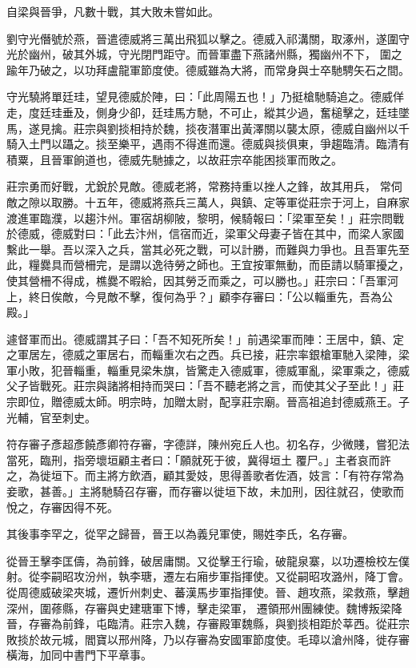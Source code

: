 \begin{pinyinscope}
 自梁與晉爭，凡數十戰，其大敗未嘗如此。



 劉守光僭號於燕，晉遣德威將三萬出飛狐以擊之。德威入祁溝關，取涿州，遂圍守光於幽州，破其外城，守光閉門距守。而晉軍盡下燕諸州縣，獨幽州不下，
 圍之踰年乃破之，以功拜盧龍軍節度使。德威雖為大將，而常身與士卒馳騁矢石之間。



 守光驍將單廷珪，望見德威於陣，曰：「此周陽五也！」乃挺槍馳騎追之。德威佯走，度廷珪垂及，側身少卻，廷珪馬方馳，不可止，縱其少過，奮槌擊之，廷珪墜馬，遂見擒。莊宗與劉掞相持於魏，掞夜潛軍出黃澤關以襲太原，德威自幽州以千騎入土門以躡之。掞至樂平，遇雨不得進而還。德威與掞俱東，爭趨臨清。臨清有積粟，且晉軍餉道也，德威先馳據之，以故莊宗卒能困掞軍而敗之。



 莊宗勇而好戰，尤銳於見敵。德威老將，常務持重以挫人之鋒，故其用兵，
 常伺敵之隙以取勝。十五年，德威將燕兵三萬人，與鎮、定等軍從莊宗于河上，自麻家渡進軍臨濮，以趨汴州。軍宿胡柳陂，黎明，候騎報曰：「梁軍至矣！」莊宗問戰於德威，德威對曰：「此去汴州，信宿而近，梁軍父母妻子皆在其中，而梁人家國繫此一舉。吾以深入之兵，當其必死之戰，可以計勝，而難與力爭也。且吾軍先至此，糧爨具而營柵完，是謂以逸待勞之師也。王宜按軍無動，而臣請以騎軍擾之，使其營柵不得成，樵爨不暇給，因其勞乏而乘之，可以勝也。」莊宗曰：「吾軍河上，終日俟敵，今見敵不擊，復何為乎？」顧李存審曰：「公以輜重先，吾為公殿。」



 遽督軍而出。德威謂其子曰：「吾不知死所矣！」前遇梁軍而陣：王居中，鎮、定之軍居左，德威之軍居右，而輜重次右之西。兵已接，莊宗率銀槍軍馳入梁陣，梁軍小敗，犯晉輜重，輜重見梁朱旗，皆驚走入德威軍，德威軍亂，梁軍乘之，德威父子皆戰死。莊宗與諸將相持而哭曰：「吾不聽老將之言，而使其父子至此！」莊宗即位，贈德威太師。明宗時，加贈太尉，配享莊宗廟。晉高祖追封德威燕王。子光輔，官至刺史。



 符存審子彥超彥饒彥卿符存審，字德詳，陳州宛丘人也。初名存，少微賤，嘗犯法當死，臨刑，指旁壞垣顧主者曰：「願就死于彼，冀得垣土
 覆尸。」主者哀而許之，為徙垣下。而主將方飲酒，顧其愛妓，思得善歌者佐酒，妓言：「有符存常為妾歌，甚善。」主將馳騎召存審，而存審以徙垣下故，未加刑，因往就召，使歌而悅之，存審因得不死。



 其後事李罕之，從罕之歸晉，晉王以為義兒軍使，賜姓李氏，名存審。



 從晉王擊李匡儔，為前鋒，破居庸關。又從擊王行瑜，破龍泉寨，以功遷檢校左僕射。從李嗣昭攻汾州，執李瑭，遷左右廂步軍指揮使。又從嗣昭攻潞州，降丁會。從周德威破梁夾城，遷忻州刺史、蕃漢馬步軍指揮使。晉、趙攻燕，梁救燕，擊趙深州，圍蓚縣，存審與史建瑭軍下博，擊走梁軍，
 遷領邢州團練使。魏博叛梁降晉，存審為前鋒，屯臨清。莊宗入魏，存審殿軍魏縣，與劉掞相距於莘西。從莊宗敗掞於故元城，閻寶以邢州降，乃以存審為安國軍節度使。毛璋以滄州降，徙存審橫海，加同中書門下平章事。




\end{pinyinscope}
